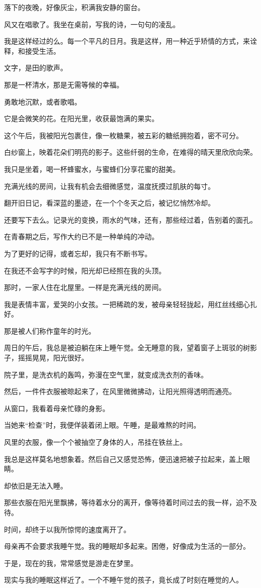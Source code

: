 		落下的夜晚，好像灰尘，积满我安静的窗台。\par
		风又在唱歌了。我坐在桌前，写我的诗，一句句的凌乱。\par
		我是这样经过的么。每一个平凡的日月。我是这样，用一种近乎矫情的方式，来诠释，和接受生活。\par
		文字，是田的歌声。

		那是一杯清水，那是无需等候的幸福。\par
		勇敢地沉默，或者歌唱。

	\endwriting



		它是会微笑的花。在阳光里，收获最饱满的果实。


		这个午后，我被阳光包裹住，像一枚糖果，被五彩的糖纸拥抱着，密不可分。\par
		白纱窗上，映着花朵们明亮的影子。这些纤弱的生命，在难得的晴天里欣欣向荣。\par
		我只是坐着，喝一杯蜂蜜水，与蜜蜂们分享花蜜的甜美。\par
		充满光线的房间，让我有机会去细微感觉，温度抚摸过肌肤的每寸。\par
		翻开旧日记，看深蓝的墨迹，在一个个冬天之后，被记忆悄然冷却。\par
		还要写下去么。记录光的变换，雨水的气味，还有，那些经过着，告别着的面孔。\par
		在青春期之后，写作大约已不是一种单纯的冲动。\par
		为了更好的记得，或者忘却，我只有不断书写。

		在我还不会写字的时候，阳光却已经照在我的头顶。\par
		那时，一家人住在北屋里。一样是充满光线的房间。\par
		我是表情丰富，爱哭的小女孩。一把稀疏的发，被母亲轻轻拢起，用红丝线细心扎好。\par
		那是被人们称作童年的时光。\par
		周日的午后，我总是被迫躺在床上睡午觉。全无睡意的我，望着窗子上斑驳的树影子，摇摇晃晃，阳光很好。\par
		院子里，是洗衣机的轰鸣，弥漫在空气里，就变成洗衣剂的香味。\par
		然后，一件件衣服被晾起来了，在风里微微拂动，让阳光照得透明而通亮。\par
		从窗口，我看着母亲忙碌的身影。\par
		当她来“检查”时，我便佯装着闭上眼。午睡，是最难熬的时间。\par
		风里的衣服，像一个个被抽空了身体的人，吊挂在铁丝上。\par
		我总是这样莫名地想象着。然后自己又感觉恐怖，便迅速把被子拉起来，盖上眼睛。\par
		却依旧是无法入睡。\par
		那些衣服在阳光里飘拂，等待着水分的离开，像等待着时间过去的我一样，迫不及待。\par
		时间，却终于以我所惊愕的速度离开了。\par
		母亲再不会要求我睡午觉。我的睡眠却多起来。困倦，好像成为生活的一部分。\par
		于是，现在的我，常常感觉是游走在梦里。\par
		现实与我的睡眠这样近了。一个不睡午觉的孩子，竟长成了时刻在睡觉的人。

